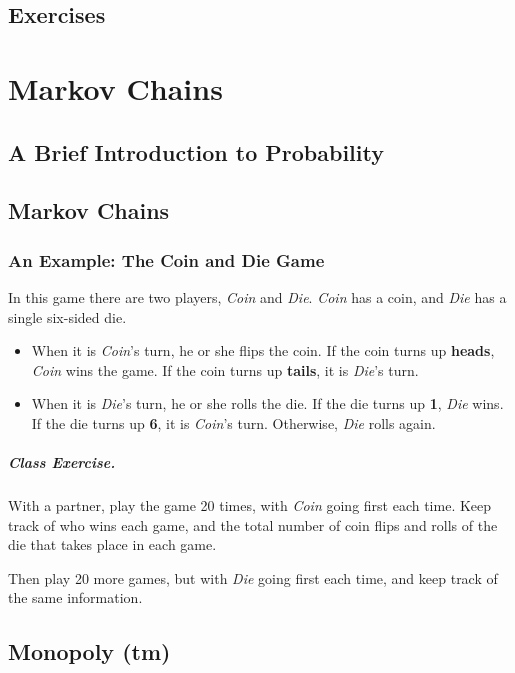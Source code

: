 \documentclass{book}
\begin{document}
\section{Exercises}
%
\chapter{Markov Chains}
\section{A Brief Introduction to Probability}
\section{Markov Chains}
\subsection{An Example: The Coin and Die Game}

In this game there are two players, \emph{Coin}
and \emph{Die}. \emph{Coin} has a coin, and \emph{Die} has a
single six-sided die.

\begin{itemize}
\item
When it is \emph{Coin}'s turn, he or she flips the coin.
If the coin turns up \textbf{heads}, \emph{Coin} wins the game.
If the coin turns up \textbf{tails}, it is \emph{Die}'s turn.

\item
When it is \emph{Die}'s turn, he or she rolls the die.
If the die turns up \textbf{1}, \emph{Die} wins.
If the die turns up \textbf{6}, it is \emph{Coin}'s turn.
Otherwise, \emph{Die} rolls again.
\end{itemize}

\paragraph{Class Exercise.}
With a partner, play the game 20 times, with \emph{Coin}
going first each time.
Keep track of who wins each game, and the total
number of coin flips and rolls of the die
that takes place in each game.

Then play 20 more games, but with \emph{Die} going first
each time, and keep track of the same information.

\section{Monopoly (tm)}
\end{document}
